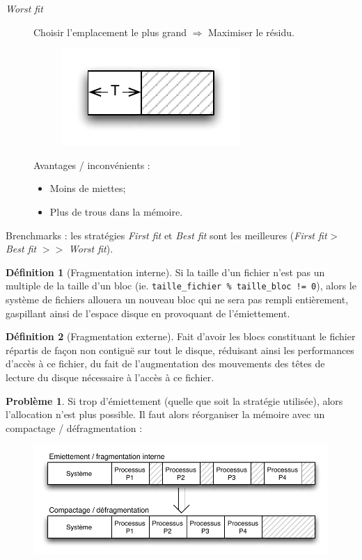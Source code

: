 \documentclass[11pt,english,french]{scrreprt}
\newcounter{cptPb}
\theoremstyle{remark}
\theoremstyle{definition}
\newtheorem*{def*}{Définition}
\newtheorem{pb}{Problème}[cptPb]
\newcommand*\Pitem{%
  \item[\color{green}\scalebox{0.9}{\textbullet}]}
\newcommand*\Citem{%
  \item[\color{red}\scalebox{0.9}{\textbullet}]}
\begin{document}
\begin{description}
	\item [\emph{Worst fit}] Choisir l'emplacement le plus grand $\Rightarrow$ Maximiser le résidu.
	
	\begin{figure}[h!]
		\center
		\vspace{-10pt}
		\includegraphics[scale=.85]{img/worstfit}
		\vspace{-15pt}
	\end{figure}
	
	Avantages / inconvénients :\begin{itemize}
		\Pitem Moins de miettes;
		\Citem Plus de trous dans la mémoire.
	\end{itemize}
\end{description}

Brenchmarks : les stratégies \emph{First fit} et \emph{Best fit} sont les meilleures (\emph{First fit} > \emph{Best fit} $>>$ \emph{Worst fit}).

\begin{def*}[Fragmentation interne]
	Si la taille d'un fichier n'est pas un multiple de la taille d'un bloc (ie. \lstinline&taille_fichier % taille_bloc != 0&), alors le système de fichiers allouera un nouveau bloc qui ne sera pas rempli entièrement, gaspillant ainsi de l'espace disque en provoquant de l'émiettement.
\end{def*}
\begin{def*}[Fragmentation externe]
	Fait d'avoir les blocs constituant le fichier répartis de façon non contiguë sur tout le disque, réduisant ainsi les performances d'accès à ce fichier, du fait de l'augmentation des mouvements des têtes de lecture du disque nécessaire à l'accès à ce fichier.
\end{def*}

\begin{pb}
	 Si trop d'émiettement (quelle que soit la stratégie utilisée), alors l'allocation n'est plus possible. Il faut alors réorganiser la mémoire avec un compactage / défragmentation :
	\begin{figure}[h!]
		\center
		\vspace{-15pt}
		\includegraphics[scale=.85]{img/defragmentation}
		\vspace{-20pt}
	\end{figure}
\end{pb}
\end{document}
